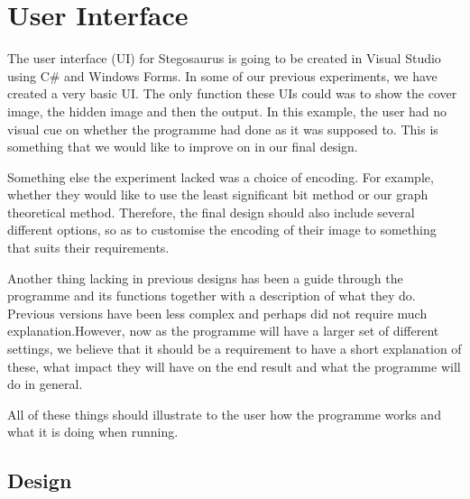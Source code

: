 \section{User Interface}

The user interface (UI) for Stegosaurus is going to be created in Visual Studio using C\# and Windows Forms.
In some of our previous experiments, we have created a very basic UI.
The only function these UIs could was to show the cover image, the hidden image and then the output.
In this example, the user had no visual cue on whether the programme had done as it was supposed to.
This is something that we would like to improve on in our final design.

Something else the experiment lacked was a choice of encoding.
For example, whether they would like to use the least significant bit method or our graph theoretical method.
Therefore, the final design should also include several different options, so as to customise the encoding of their image to something that suits their requirements.

Another thing lacking in previous designs has been a guide through the programme and its functions together with a description of what they do.
Previous versions have been less complex and perhaps did not require much explanation.However, now as the programme will have a larger set of different settings, we believe that it should be a requirement to have a short explanation of these, what impact they will have on the end result and what the programme will do in general.

All of these things should illustrate to the user how the programme works and what it is doing when running.

\subsection{Design}

